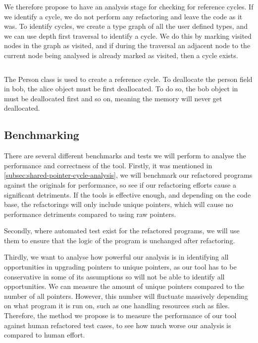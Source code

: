 \documentclass{proposal}
\begin{document}
    We therefore propose to have an analysis stage for checking for reference cycles.
    If we identify a cycle, we do not perform any refactoring and leave the code as it was.
    To identify cycles, we create a type graph of all the user defined types, and we can use depth first traversal to identify a cycle.
    We do this by marking visited nodes in the graph as visited, and if during the traversal an adjacent node to the current node being analysed is already marked as visited, then a cycle exists.

    \begin{listing}
        \inputminted{c++}{code/reference-cycle.cpp}
        \caption{The Person class is used to create a reference cycle. To deallocate the person field in bob, the alice object must be first deallocated. To do so, the bob object in must be deallocated first and so on, meaning the memory will never get deallocated.}
        \label{lst:reference-cycle}
    \end{listing}

    \subsection{Benchmarking}\label{subsec:benchmarking}

    There are several different benchmarks and tests we will perform to analyse the performance and correctness of the tool.
    Firstly, it was mentioned in \autoref{subsec:shared-pointer-cycle-analysis}, we will benchmark our refactored programs against the originals for performance, so see if our refactoring efforts cause a significant detriments.
    If the tools is effective enough, and depending on the code base, the refactorings will only include unique pointers, which will cause no performance detriments compared to using raw pointers.

    Secondly, where automated test exist for the refactored programs, we will use them to ensure that the logic of the program is unchanged after refactoring.

    Thirdly, we want to analyse how powerful our analysis is in identifying all opportunities in upgrading pointers to unique pointers, as our tool has to be conservative in some of its assumptions so will not be able to identify all opportunities.
    We can measure the amount of unique pointers compared to the number of all pointers.
    However, this number will fluctuate massively depending on what program it is run on, such as one handling resources such as files.
    Therefore, the method we propose is to measure the performance of our tool against human refactored test cases, to see how much worse our analysis is compared to human effort.
\end{document}
